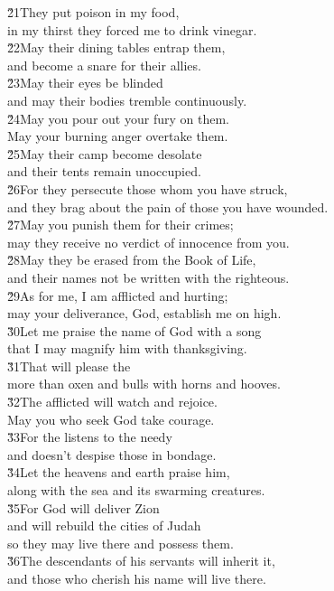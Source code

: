 \begin{poetry}
\poeml \v{21}They put poison in my food, \\
\poemll    in my thirst they forced me to drink vinegar. \\
\poeml \v{22}May their dining tables entrap them, \\
\poemll    and become a snare for their allies. \\
\poeml \v{23}May their eyes be blinded \\
\poemll    and may their bodies tremble continuously. \\
\poeml \v{24}May you pour out your fury on them. \\
\poemll    May your burning anger overtake them. \\
\poeml \v{25}May their camp become desolate \\
\poemll    and their tents remain unoccupied. \\
\poeml \v{26}For they persecute those whom you have struck, \\
\poemll    and they brag about the pain of those you have wounded. \\
\poeml \v{27}May you punish them for their crimes; \\
\poemll    may they receive no verdict of innocence from you. \\
\poeml \v{28}May they be erased from the Book of Life, \\
\poemll    and their names not be written with the righteous. \\
\poeml \v{29}As for me, I am afflicted and hurting; \\
\poemll    may your deliverance, God, establish me on high. \\
\poeml \v{30}Let me praise the name of God with a song \\
\poemll    that I may magnify him with thanksgiving. \\
\poeml \v{31}That will please the  \\
\poemll    more than oxen and bulls with horns and hooves. \\
\poeml \v{32}The afflicted will watch and rejoice. \\
\poemll    May you who seek God take courage. \\
\poeml \v{33}For the  listens to the needy \\
\poemll    and doesn't despise those in bondage. \\
\poeml \v{34}Let the heavens and earth praise him, \\
\poemll    along with the sea and its swarming creatures. \\
\poeml \v{35}For God will deliver Zion \\
\poemll    and will rebuild the cities of Judah \\
\poemlll       so they may live there and possess them. \\
\poeml \v{36}The descendants of his servants will inherit it, \\
\poemll    and those who cherish his name will live there.
\end{poetry}
